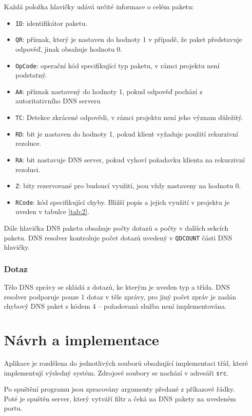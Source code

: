 \documentclass[a4paper, 11pt]{article}
\begin{document}
	Každá položka hlavičky udává určité informace o celém paketu:

	\begin{itemize}
	\item \texttt{ID}: identifikátor paketu.
	\item \texttt{QR}: příznak, který je nastaven do hodnoty 1 v případě, že paket představuje odpověď, jinak obsahuje hodnotu 0.
	\item \texttt{OpCode}: operační kód specifikující typ paketu, v rámci projektu není podstatný.
	\item \texttt{AA}: příznak nastavený do hodnoty 1, pokud odpověď pochází z autoritativního DNS serveru
	\item \texttt{TC}: Detekce zkrácené odpovědi, v rámci projektu není jeho význam důležitý.
	\item \texttt{RD}: bit je nastaven do hodnoty 1, pokud klient vyžaduje použití rekurzivní rezoluce.
	\item \texttt{RA}: bit nastavuje DNS server, pokud vyhoví požadavku klienta na rekurzivní rezoluci.
	\item \texttt{Z}: bity rezervované pro budoucí využití, jsou vždy nastaveny na hodnotu 0.
	\item \texttt{RCode}: kód specifikující chyby. Bližší popis a jejich využití v projektu je uveden v tabulce \ref{tab:2}.
	\end{itemize}

	Dále hlavička DNS paketu obsahuje počty dotazů a počty v dalších sekcích paketu. DNS resolver kontroluje počet dotazů uvedený v \texttt{QDCOUNT} části DNS hlavičky.

	\subsubsection{Dotaz}
	Tělo DNS zprávy se skládá z dotazů, ke kterým je uveden typ a třída. DNS resolver podporuje pouze 1 dotaz v těle zprávy, pro jiný počet zpráv je zaslán chybový DNS paket s kódem 4 -- požadovaná služba není implementována.

	\section{Návrh a implementace}
	Aplikace je rozdělena do jednotlivých souborů obsahující implementaci tříd, které implementují výsledný systém. Zdrojové soubory se nachází v adresáři \texttt{src}.
	
	Po spuštění programu jsou zpracovány argumenty předané z příkazové řádky. Poté je spuštěn server, který vytváří filtr a čeká na DNS pakety na uvedeném portu.
	
\end{document}
